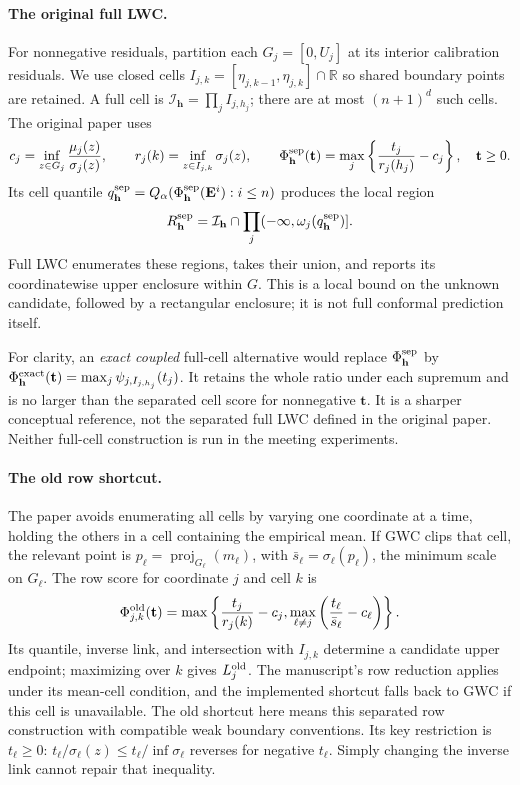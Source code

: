 \paragraph{The original full LWC.}
For nonnegative residuals, partition each $G_j=[0,U_j]$ at its interior
calibration residuals. We use closed cells
$I_{j,k}=[\eta_{j,k-1},\eta_{j,k}]\cap\mathbb R$ so shared boundary points
are retained. A full cell is $\mathcal I_{\mathbf h}=\prod_jI_{j,h_j}$;
there are at most $(n+1)^d$ such cells. The original paper uses
\begin{equation}\label{mt:separated}
 c_j=\inf_{z\in G_j}\frac{\mu_j(z)}{\sigma_j(z)},\qquad
 r_j(k)=\inf_{z\in I_{j,k}}\sigma_j(z),\qquad
 \Phi^{\rm sep}_{\mathbf h}(\mathbf t)
       =\max_j\left\{\frac{t_j}{r_j(h_j)}-c_j\right\},\quad\mathbf t\ge0.
\end{equation}
Its cell quantile $q^{\rm sep}_{\mathbf h}=Q_\alpha(
\Phi^{\rm sep}_{\mathbf h}(\mathbf E^i):i\le n)$ produces the local region
\[
 R^{\rm sep}_{\mathbf h}=
 \mathcal I_{\mathbf h}\cap\prod_j(-\infty,\omega_j(q^{\rm sep}_{\mathbf h})].
\]
Full LWC enumerates these regions, takes their union, and reports its
coordinatewise upper enclosure within $G$. This is a local bound on the
unknown candidate, followed by a rectangular enclosure; it is not full
conformal prediction itself.

For clarity, an \emph{exact coupled} full-cell alternative would replace
$\Phi^{\rm sep}_{\mathbf h}$ by
$\Phi^{\rm exact}_{\mathbf h}(\mathbf t)=
\max_j\psi_{j,I_{j,h_j}}(t_j)$.
It retains the whole ratio under each supremum and is no larger than the
separated cell score for nonnegative $\mathbf t$. It is a sharper conceptual
reference, not the separated full LWC defined in the original paper.
Neither full-cell construction is run in the meeting experiments.

\paragraph{The old row shortcut.}
The paper avoids enumerating all cells by varying one coordinate at a time,
holding the others in a cell containing the empirical mean. If GWC clips that
cell, the relevant point is $p_\ell=\operatorname{proj}_{G_\ell}(m_\ell)$,
with $\bar s_\ell=\sigma_\ell(p_\ell)$, the minimum scale on $G_\ell$.
The row score for coordinate $j$ and cell $k$ is
\begin{equation}\label{mt:oldrow}
 \Phi^{\rm old}_{j,k}(\mathbf t)=
 \max\left\{\frac{t_j}{r_j(k)}-c_j,
             \max_{\ell\ne j}\left(\frac{t_\ell}{\bar s_\ell}-c_\ell\right)
      \right\}.
\end{equation}
Its quantile, inverse link, and intersection with $I_{j,k}$ determine a
candidate upper endpoint; maximizing over $k$ gives $L_j^{\rm old}$.
The manuscript's row reduction applies under its mean-cell condition, and
the implemented shortcut falls back to GWC if this cell is unavailable.
The old shortcut here means this separated row construction with compatible
weak boundary conventions. Its key restriction is $t_\ell\ge0$:
$t_\ell/\sigma_\ell(z)\le t_\ell/\inf\sigma_\ell$ reverses for negative
$t_\ell$. Simply changing the inverse link cannot repair that inequality.

